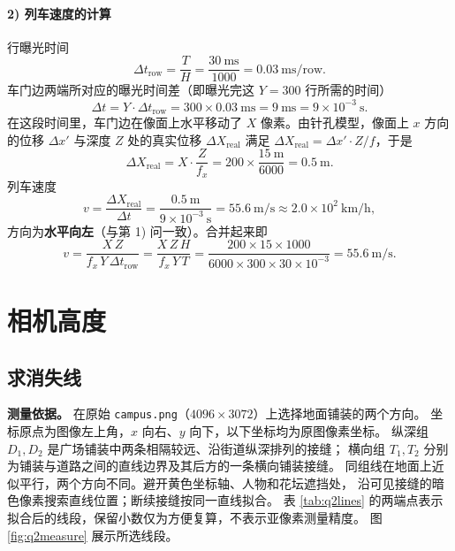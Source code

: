\documentclass[11pt,a4paper]{ctexart}
\begin{document}
\paragraph{2) 列车速度的计算}

行曝光时间
\begin{equation}
\Delta t_{\text{row}}=\frac{T}{H}=\frac{30\ \text{ms}}{1000}=0.03\ \text{ms/row}.
\end{equation}
车门边两端所对应的曝光时间差（即曝光完这 $Y=300$ 行所需的时间）
\begin{equation}
\Delta t=Y\cdot\Delta t_{\text{row}}=300\times 0.03\ \text{ms}=9\ \text{ms}=9\times10^{-3}\ \text{s}.
\end{equation}
在这段时间里，车门边在像面上水平移动了 $X$ 像素。由针孔模型，像面上 $x$ 方向的位移 $\Delta x'$ 与深度 $Z$ 处的真实位移 $\Delta X_{\text{real}}$ 满足
$\Delta X_{\text{real}}=\Delta x'\cdot Z/f$，于是
\begin{equation}
\Delta X_{\text{real}}=X\cdot\frac{Z}{f_x}=200\times\frac{15\ \text{m}}{6000}=0.5\ \text{m}.
\end{equation}
列车速度
\begin{equation}
v=\frac{\Delta X_{\text{real}}}{\Delta t}=\frac{0.5\ \text{m}}{9\times10^{-3}\ \text{s}}
=55.6\ \text{m/s}\approx 2.0\times10^{2}\ \text{km/h},
\end{equation}
方向为\textbf{水平向左}（与第 1) 问一致）。合并起来即
\begin{equation}
v=\frac{X\,Z}{f_x\,Y\,\Delta t_{\text{row}}}=\frac{X\,Z\,H}{f_x\,Y\,T}
=\frac{200\times15\times1000}{6000\times300\times30\times10^{-3}}=55.6\ \text{m/s}.
\end{equation}

\clearpage
\section{相机高度}

\subsection{求消失线}

\textbf{测量依据。} 在原始 \texttt{campus.png}（$4096\times3072$）上选择地面铺装的两个方向。
坐标原点为图像左上角，$x$ 向右、$y$ 向下，以下坐标均为原图像素坐标。
纵深组 $D_1,D_2$ 是广场铺装中两条相隔较远、沿街道纵深排列的接缝；
横向组 $T_1,T_2$ 分别为铺装与道路之间的直线边界及其后方的一条横向铺装接缝。
同组线在地面上近似平行，两个方向不同。避开黄色坐标轴、人物和花坛遮挡处，
沿可见接缝的暗色像素搜索直线位置；断续接缝按同一直线拟合。
表 \ref{tab:q2lines} 的两端点表示拟合后的线段，保留小数仅为方便复算，不表示亚像素测量精度。
图 \ref{fig:q2measure} 展示所选线段。
\end{document}
